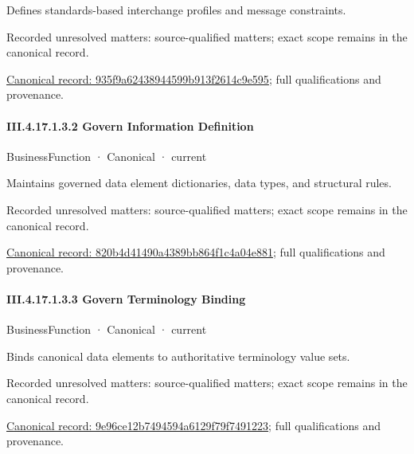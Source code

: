 Defines standards-based interchange profiles and message constraints.


{\small Recorded unresolved matters: source-qualified matters; exact scope remains in the canonical record.}\par
{\footnotesize \href{../../../../../../../continuum/business/business-function/935f9a62438944599b913f2614c9e595.md}{Canonical record: 935f9a62438944599b913f2614c9e595}; full qualifications and provenance.}\par
\paragraph*{III.4.17.1.3.2 Govern Information Definition}
\label{navigation:III.4.17.1.3.2}

\label{element:820b4d41490a4389bb864f1c4a04e881}
{\small BusinessFunction · Canonical · current}\par

Maintains governed data element dictionaries, data types, and structural rules.


{\small Recorded unresolved matters: source-qualified matters; exact scope remains in the canonical record.}\par
{\footnotesize \href{../../../../../../../continuum/business/business-function/820b4d41490a4389bb864f1c4a04e881.md}{Canonical record: 820b4d41490a4389bb864f1c4a04e881}; full qualifications and provenance.}\par
\paragraph*{III.4.17.1.3.3 Govern Terminology Binding}
\label{navigation:III.4.17.1.3.3}

\label{element:9e96ce12b7494594a6129f79f7491223}
{\small BusinessFunction · Canonical · current}\par

Binds canonical data elements to authoritative terminology value sets.


{\small Recorded unresolved matters: source-qualified matters; exact scope remains in the canonical record.}\par
{\footnotesize \href{../../../../../../../continuum/business/business-function/9e96ce12b7494594a6129f79f7491223.md}{Canonical record: 9e96ce12b7494594a6129f79f7491223}; full qualifications and provenance.}\par
